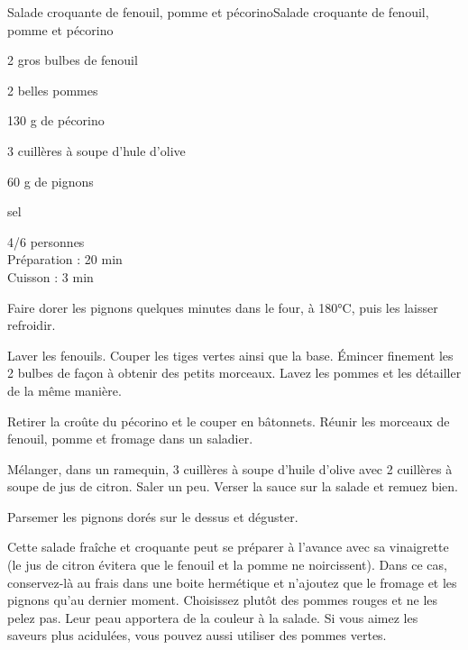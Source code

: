 \begin{recette}{Salade croquante de fenouil, pomme et pécorino}{Salade croquante de fenouil, pomme et pécorino}

\begin{ingredients}
2 gros bulbes de fenouil\par
2 belles pommes\par
130 g de pécorino\par
3 cuillères à soupe d'hule d'olive\par
60 g de pignons\par
sel\par
\end{ingredients}

\begin{infos}
4/6 personnes\\
Préparation : 20 min\\
Cuisson : 3 min\\
\end{infos}

\begin{etapes}
\item Faire dorer les pignons quelques minutes dans le four, à 180°C, puis les laisser refroidir.
\item Laver les fenouils. Couper les tiges vertes ainsi que la base. Émincer finement les 2 bulbes de façon à obtenir des petits morceaux. Lavez les pommes et les détailler de la même manière.
\item Retirer la croûte du pécorino et le couper en bâtonnets. Réunir les morceaux de fenouil, pomme et fromage dans un saladier.
\item Mélanger, dans un ramequin, 3 cuillères à soupe d'huile d'olive avec 2 cuillères à soupe de jus de citron. Saler un peu. Verser la sauce sur la salade et remuez bien.
\item Parsemer les pignons dorés sur le dessus et déguster.
\end{etapes}

\begin{conseils}
Cette salade fraîche et croquante peut se préparer à l'avance avec sa vinaigrette (le jus de citron évitera que le fenouil et la pomme ne noircissent). Dans ce cas, conservez-là au frais dans une boite hermétique et n'ajoutez que le fromage et les pignons qu'au dernier moment.
Choisissez plutôt des pommes rouges et ne les pelez pas. Leur peau apportera de la couleur à la salade. Si vous aimez les saveurs plus acidulées, vous pouvez aussi utiliser des pommes vertes.
\end{conseils}

\end{recette}
